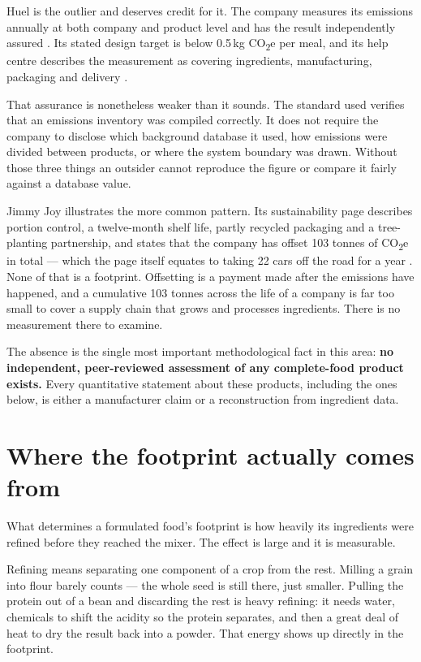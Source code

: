 \documentclass[11pt,a4paper]{article}
\newcommand{\co}{CO\textsubscript{2}e}
\begin{document}
Huel is the outlier and deserves credit for it. The company measures its emissions
annually at both company and product level and has the result independently assured
\cite{huel-sustain,huel-nutrition}. Its stated design target is below 0.5\,kg \co{}
per meal, and its help centre describes the measurement as covering ingredients,
manufacturing, packaging and delivery \cite{huel-help}.

That assurance is nonetheless weaker than it sounds. The standard used verifies that
an emissions inventory was compiled correctly. It does not require the company to
disclose which background database it used, how emissions were divided between
products, or where the system boundary was drawn. Without those three things an
outsider cannot reproduce the figure or compare it fairly against a database value.

Jimmy Joy illustrates the more common pattern. Its sustainability page describes
portion control, a twelve-month shelf life, partly recycled packaging and a
tree-planting partnership, and states that the company has offset 103 tonnes of \co{}
in total — which the page itself equates to taking 22 cars off the road for a year
\cite{jimmyjoy}. None of that is a footprint. Offsetting is a payment made after the
emissions have happened, and a cumulative 103 tonnes across the life of a company is
far too small to cover a supply chain that grows and processes ingredients. There is
no measurement there to examine.

The absence is the single most important methodological fact in this area:
\textbf{no independent, peer-reviewed assessment of any complete-food product
exists.} Every quantitative statement about these products, including the ones
below, is either a manufacturer claim or a reconstruction from ingredient data.

\section{Where the footprint actually comes from}

What determines a formulated food's footprint is how heavily its ingredients were
refined before they reached the mixer. The effect is large and it is measurable.

Refining means separating one component of a crop from the rest. Milling a grain into
flour barely counts — the whole seed is still there, just smaller. Pulling the protein
out of a bean and discarding the rest is heavy refining: it needs water, chemicals to
shift the acidity so the protein separates, and then a great deal of heat to dry the
result back into a powder. That energy shows up directly in the footprint.
\end{document}

